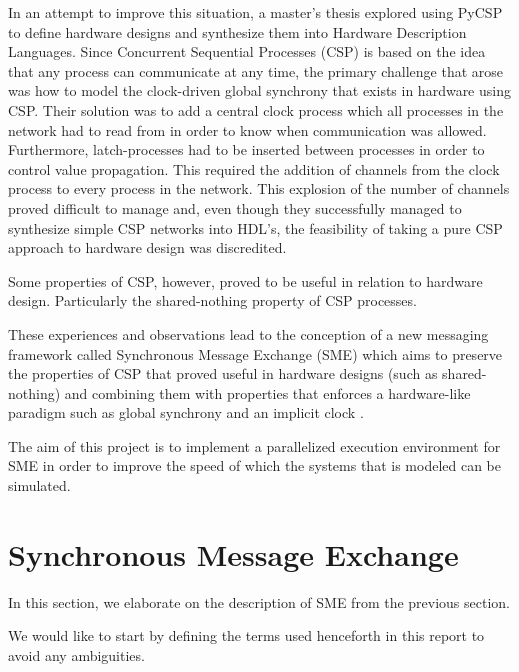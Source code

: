 In an attempt to improve this situation, a master's
thesis\cite{thesis} explored using PyCSP to define hardware designs
and synthesize them into Hardware Description Languages. Since
Concurrent Sequential Processes (CSP) is based on the idea that any
process can communicate at any time, the primary challenge that arose
was how to model the clock-driven global synchrony that exists in
hardware using CSP. Their solution was to add a central clock process
which all processes in the network had to read from in order to know
when communication was allowed. Furthermore, latch-processes had to be
inserted between processes in order to control value propagation. This
required the addition of channels from the clock process to every
process in the network. This explosion of the number of channels
proved difficult to manage and, even though they successfully managed
to synthesize simple CSP networks into HDL's, the feasibility of
taking a pure CSP approach to hardware design was discredited.

Some properties of CSP, however, proved to be useful in relation to
hardware design. Particularly the shared-nothing property of CSP
processes.

These experiences and observations lead to the conception of a new
messaging framework called Synchronous Message Exchange (SME) which
aims to preserve the properties of CSP that proved useful in hardware
designs (such as shared-nothing) and combining them with properties that
enforces a hardware-like paradigm such as global synchrony and an
implicit clock \cite{vinter2014synchronous}.

The aim of this project is to implement a parallelized execution
environment for SME in order to improve the speed of which the systems
that is modeled can be simulated.



\section{Synchronous Message Exchange}
In this section, we elaborate on the description of SME from the
previous section.

We would like to start by defining the terms used henceforth in this
report to avoid any ambiguities.


